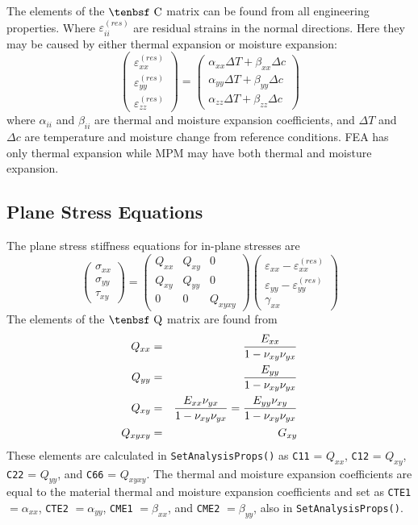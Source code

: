 \documentclass[11pt]{article}
\def\a#1{\alpha_{#1}}
\def\b#1{\beta_{#1}}
\def\C{\hbox{\tenbsf C}}
\def\code#1{{\small\tt #1}}
\def\DT{\Delta T}
\def\e#1{\varepsilon_{#1}}
\def\er#1{\varepsilon_{#1}^{(res)}}
\def\g#1{\gamma_{#1}}
\def\Q{\hbox{\tenbsf Q}}
\def\s#1{\sigma_{#1}}
\def\t#1{\tau_{#1}}
\def\v#1{\nu_{#1}}
\def\vvec#1#2#3{\left(\begin{array}{ccc} #1 \\ #2 \\ #3 \end{array}\right)}
\def\symmat#1#2#3#4#5#6{\left(\begin{array}{ccc} #1 & #2 & #3 \\ #2 & #4 & #5 \\
                                                      #3 & #5 & #6 \end{array}\right)}
\begin{document}
The elements of the $\C$ matrix can be found from all engineering properties. Where $\er{ii}$ are  residual strains in the normal directions. Here they may be caused by either thermal expansion or moisture expansion:
\begin{equation}
\left(\begin{array}{c} \er{xx} \\ \er{yy} \\ \er{zz} \end{array}\right)
       =  \left(\begin{array}{c}
	\a{xx}\DT + \b{xx}\Delta c \\
	\a{yy}\DT + \b{yy}\Delta c \\
	\a{zz}\DT + \b{zz}\Delta c  \end{array}\right)
\end{equation}
where $\a{ii}$ and $\b{ii}$ are thermal and moisture expansion coefficients, and $\DT$ and $\Delta c$ are temperature and moisture change from reference conditions. FEA has only thermal expansion while MPM may have both thermal and moisture expansion.

\subsection{Plane Stress Equations}

The plane stress stiffness equations for in-plane stresses are
\begin{equation}
      \vvec{\s{xx}}{\s{yy}}{\t{xy}} = \symmat{Q_{xx}}{Q_{xy}}{0}{Q_{yy}}{0}{Q_{xyxy}}
          \vvec{\e{xx} - \er{xx}}{\e{yy} - \er{yy}}{\g{xx}}
 \end{equation}
The elements of the $\Q$ matrix are found from
\begin{eqnarray}%
   Q_{xx} &  = &  {E_{xx}\over 1 - \v{xy}\v{yx}} \\
   Q_{yy} & = & {E_{yy}\over 1 - \v{xy}\v{yx}} \\
   Q_{xy} &  = & {E_{xx}\v{yx}\over 1 - \v{xy}\v{yx}}  =  {E_{yy}\v{xy}\over 1 - \v{xy}\v{yx}}\\
   Q_{xyxy} & = &  G_{xy} 
\end{eqnarray}%
These elements are calculated in \code{SetAnalysisProps()} as \code{C11} = $Q_{xx}$, \code{C12} = $Q_{xy}$, \code{C22} = $Q_{yy}$, and \code{C66} = $Q_{xyxy}$. The thermal  and moisture expansion coefficients are equal to the material thermal  and moisture expansion coefficients and set as \code{CTE1} $=\a{xx}$, \code{CTE2} $=\a{yy}$, \code{CME1} $=\b{xx}$, and \code{CME2} $=\b{yy}$, also in \code{SetAnalysisProps()}.
\end{document}
